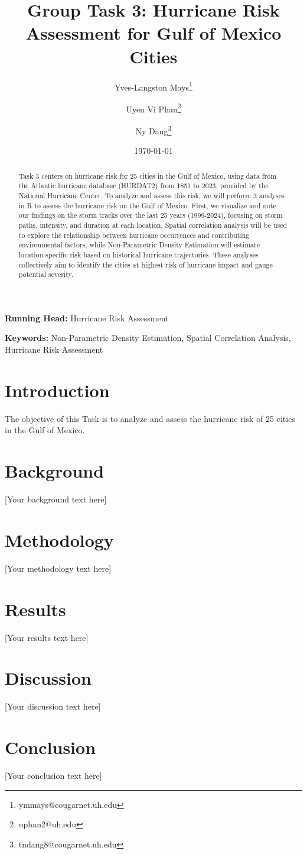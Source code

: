 \documentclass[12pt,letterpaper]{article}
\begin{document}
\title{Group Task 3: Hurricane Risk Assessment for Gulf of Mexico Cities}
\author[1]{Yves-Langston Mays\thanks{ymmays@cougarnet.uh.edu}}
\author[1]{Uyen Vi Phan\thanks{uphan2@uh.edu}}
\author[1]{Ny Dang\thanks{tndang8@cougarnet.uh.edu}}
\date{\today}

\maketitle

{\small\textbf{Running Head:} Hurricane Risk Assessment}

\vspace{0.5cm}
{\small\textbf{Keywords:} Non-Parametric Density Estimation, Spatial Correlation Analysis, Hurricane Risk Assessment}

\newpage

\begin{abstract}
Task 3 centers on hurricane risk for 25 cities in the Gulf of Mexico, using data from the Atlantic hurricane database (HURDAT2) from 1851 to 2023, provided by the National Hurricane Center. To analyze and assess this risk, we will perform 3 analyses in R to assess the hurricane risk on the Gulf of Mexico. First, we visualize and note our findings on the storm tracks over the last 25 years (1999-2024), focusing on storm paths, intensity, and duration at each location. Spatial correlation analysis will be used to explore the relationship between hurricane occurrences and contributing environmental factors, while Non-Parametric Density Estimation will estimate location-specific risk based on historical hurricane trajectories. These analyses collectively aim to identify the cities at highest risk of hurricane impact and gauge potential severity.
\end{abstract}

\newpage

\section{Introduction}
The objective of this Task is to analyze and assess the hurricane risk of 25 cities in the Gulf of Mexico.


\section{Background}
[Your background text here]

\section{Methodology}
[Your methodology text here]

\section{Results}
[Your results text here]

\section{Discussion}
[Your discussion text here]

\section{Conclusion}
[Your conclusion text here]

\printbibliography[heading=bibintoc,title={References}]
\end{document}
